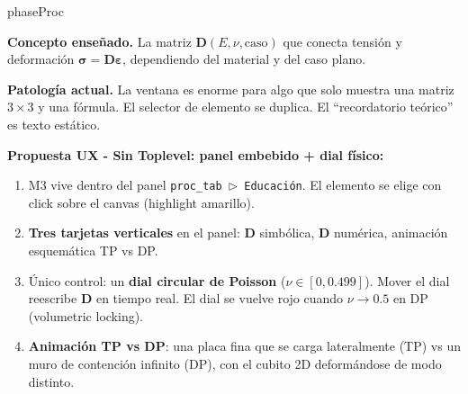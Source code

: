 \documentclass[11pt,a4paper]{article}
\begin{document}
\begin{moduleBox}{phaseProc}

\textbf{Concepto enseñado.} La matriz $\mathbf{D}(E, \nu, \text{caso})$
que conecta tensión y deformación $\boldsymbol{\sigma} = \mathbf{D}
\boldsymbol{\varepsilon}$, dependiendo del material y del caso plano.

\textbf{Patología actual.} La ventana es enorme para algo que solo muestra
una matriz $3 \times 3$ y una fórmula. El selector de elemento se duplica.
El ``recordatorio teórico'' es texto estático.

\textbf{Propuesta UX - Sin Toplevel: panel embebido + dial físico:}
\begin{enumerate}[leftmargin=1.2em, itemsep=2pt]
  \item M3 vive dentro del panel \texttt{proc\_tab\,$\triangleright$\,Educación}.
        El elemento se elige con click sobre el canvas (highlight amarillo).
  \item \textbf{Tres tarjetas verticales} en el panel: $\mathbf{D}$ simbólica,
        $\mathbf{D}$ numérica, animación esquemática TP vs DP.
  \item Único control: un \textbf{dial circular de Poisson} ($\nu \in
        [0, 0.499]$). Mover el dial reescribe $\mathbf{D}$ en tiempo real.
        El dial se vuelve rojo cuando $\nu \to 0.5$ en DP (volumetric locking).
  \item \textbf{Animación TP vs DP}: una placa fina que se carga lateralmente
        (TP) vs un muro de contención infinito (DP), con el cubito 2D
        deformándose de modo distinto.
\end{enumerate}

\begin{center}
\end{center}
\end{moduleBox}
\end{document}
